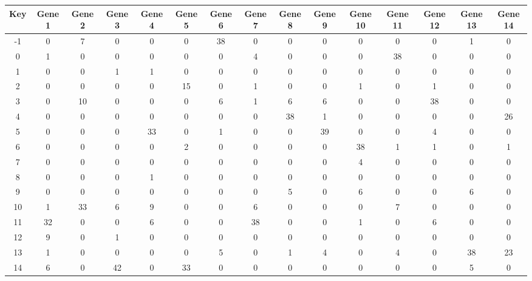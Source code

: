 \begin{tabular}{|c|c|c|c|c|c|c|c|c|c|c|c|c|c|c|}
\hline
Key & Gene 1 & Gene 2 & Gene 3 & Gene 4 & Gene 5 & Gene 6 & Gene 7 & Gene 8 & Gene 9 & Gene 10 & Gene 11 & Gene 12 & Gene 13 & Gene 14 \\
\hline
-1 & 0 & 7 & 0 & 0 & 0 & 38 & 0 & 0 & 0 & 0 & 0 & 0 & 1 & 0 \\
0 & 1 & 0 & 0 & 0 & 0 & 0 & 4 & 0 & 0 & 0 & 38 & 0 & 0 & 0 \\
1 & 0 & 0 & 1 & 1 & 0 & 0 & 0 & 0 & 0 & 0 & 0 & 0 & 0 & 0 \\
2 & 0 & 0 & 0 & 0 & 15 & 0 & 1 & 0 & 0 & 1 & 0 & 1 & 0 & 0 \\
3 & 0 & 10 & 0 & 0 & 0 & 6 & 1 & 6 & 6 & 0 & 0 & 38 & 0 & 0 \\
4 & 0 & 0 & 0 & 0 & 0 & 0 & 0 & 38 & 1 & 0 & 0 & 0 & 0 & 26 \\
5 & 0 & 0 & 0 & 33 & 0 & 1 & 0 & 0 & 39 & 0 & 0 & 4 & 0 & 0 \\
6 & 0 & 0 & 0 & 0 & 2 & 0 & 0 & 0 & 0 & 38 & 1 & 1 & 0 & 1 \\
7 & 0 & 0 & 0 & 0 & 0 & 0 & 0 & 0 & 0 & 4 & 0 & 0 & 0 & 0 \\
8 & 0 & 0 & 0 & 1 & 0 & 0 & 0 & 0 & 0 & 0 & 0 & 0 & 0 & 0 \\
9 & 0 & 0 & 0 & 0 & 0 & 0 & 0 & 5 & 0 & 6 & 0 & 0 & 6 & 0 \\
10 & 1 & 33 & 6 & 9 & 0 & 0 & 6 & 0 & 0 & 0 & 7 & 0 & 0 & 0 \\
11 & 32 & 0 & 0 & 6 & 0 & 0 & 38 & 0 & 0 & 1 & 0 & 6 & 0 & 0 \\
12 & 9 & 0 & 1 & 0 & 0 & 0 & 0 & 0 & 0 & 0 & 0 & 0 & 0 & 0 \\
13 & 1 & 0 & 0 & 0 & 0 & 5 & 0 & 1 & 4 & 0 & 4 & 0 & 38 & 23 \\
14 & 6 & 0 & 42 & 0 & 33 & 0 & 0 & 0 & 0 & 0 & 0 & 0 & 5 & 0 \\
\hline
\end{tabular}